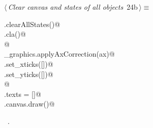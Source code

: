\documentclass[11.5pt]{report}
\begin{document}
\begin{flushleft} \small\label{scrap19}\raggedright\small
{} $\langle\,${\itshape Clear canvas and states of all objects}\nobreak\ {\footnotesize {24b}}$\,\rangle\equiv$
\vspace{-1ex}
\begin{list}{}{} \item
\mbox{}\verb@run.clearAllStates()@\\
\mbox{}\verb@ax.cla()@\\
\mbox{}\verb@              @\\
\mbox{}\verb@utils_graphics.applyAxCorrection(ax)@\\
\mbox{}\verb@ax.set_xticks([])@\\
\mbox{}\verb@ax.set_yticks([])@\\
\mbox{}\verb@                 @\\
\mbox{}\verb@fig.texts = []@\\
\mbox{}\verb@fig.canvas.draw()@\\
\mbox{}\verb@@{\NWsep}
\end{list}
\vspace{-1.5ex}
\footnotesize
\begin{list}{}{\setlength{\itemsep}{-\parsep}\setlength{\itemindent}{-\leftmargin}}
\item \NWtxtMacroRefIn\ .

\item{}
\end{list}
\vspace{4ex}
\end{flushleft}
\vspace{-0.8cm}\newchunk 
\end{document}
